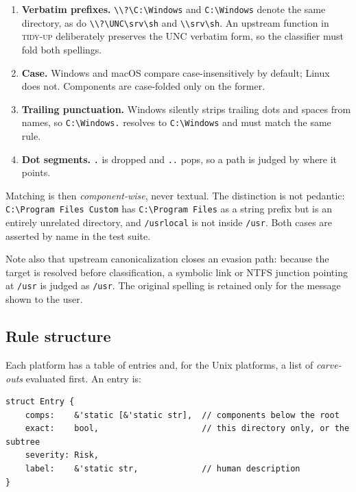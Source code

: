\documentclass[11pt,a4paper]{article}
\newcommand{\code}[1]{\texttt{\small #1}}
\newcommand{\tool}{\textsc{tidy-up}}
\begin{document}
\begin{enumerate}[leftmargin=1.6em,itemsep=0.2em]
  \item \textbf{Verbatim prefixes.} \code{\textbackslash\textbackslash?\textbackslash C:\textbackslash Windows} and
    \code{C:\textbackslash Windows} denote the same directory, as do
    \code{\textbackslash\textbackslash?\textbackslash UNC\textbackslash srv\textbackslash sh} and
    \code{\textbackslash\textbackslash srv\textbackslash sh}. An upstream function in \tool{} deliberately
    preserves the UNC verbatim form, so the classifier must fold both spellings.
  \item \textbf{Case.} Windows and macOS compare case-insensitively by default; Linux
    does not. Components are case-folded only on the former.
  \item \textbf{Trailing punctuation.} Windows silently strips trailing dots and
    spaces from names, so \code{C:\textbackslash Windows.\textvisiblespace} resolves to
    \code{C:\textbackslash Windows} and must match the same rule.
  \item \textbf{Dot segments.} \code{.} is dropped and \code{..} pops, so a path is
    judged by where it points.
\end{enumerate}

Matching is then \emph{component-wise}, never textual. The distinction is not
pedantic: \code{C:\textbackslash Program Files Custom} has \code{C:\textbackslash Program Files} as a string
prefix but is an entirely unrelated directory, and \code{/usrlocal} is not inside
\code{/usr}. Both cases are asserted by name in the test suite.

Note also that upstream canonicalization closes an evasion path: because the target is
resolved before classification, a symbolic link or NTFS junction pointing at
\code{/usr} is judged as \code{/usr}. The original spelling is retained only for the
message shown to the user.

\subsection{Rule structure}

Each platform has a table of entries and, for the Unix platforms, a list of
\emph{carve-outs} evaluated first. An entry is:

\begin{lstlisting}
struct Entry {
    comps:    &'static [&'static str],  // components below the root
    exact:    bool,                     // this directory only, or the subtree
    severity: Risk,
    label:    &'static str,             // human description
}
\end{lstlisting}
\end{document}
